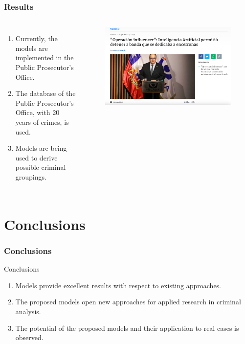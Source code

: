 \documentclass[aspectratio=169]{beamer}
\begin{document}
\begin{frame}
\frametitle{Results}
  \begin{columns}
  \begin{enumerate}
    \item Currently, the models are implemented in the Public Prosecutor's Office.
    \item The database of the Public Prosecutor's Office, with 20 years of crimes, is used.
    \item Models are being used to derive possible criminal groupings.
  \end{enumerate}
  \begin{figure}[ht]
    \centering
    \includegraphics[width=\textwidth]{images/inf.png}
  \end{figure}
\end{columns}
\end{frame}

\section{Conclusions}
\begin{frame}
\frametitle{Conclusions}
  \begin{block}{Conclusions}
    \begin{enumerate}
      \item Models provide excellent results with respect to existing approaches.
      \item The proposed models open new approaches for applied research in criminal analysis.
      \item The potential of the proposed models and their application to real cases is observed.
    \end{enumerate}
  \end{block}
\end{frame}
\end{document}
